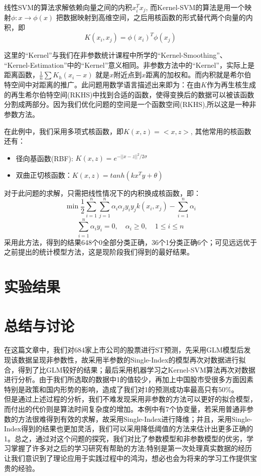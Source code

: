 \documentclass[a4paper,UTF8]{article}
\begin{document}
线性SVM的算法求解依赖向量之间的内积$x_{i}^{T}x_{j}$, 而Kernel-SVM的算法是用一个映射$\phi:x\rightarrow\phi(x)$ 把数据映射到高维空间，之后用核函数的形式替代两个向量的内积，即
$$K(x_{i},x_{j})=\phi(x_{i})^{T}\phi(x_{j}) $$

这里的“Kernel”与我们在非参数统计课程中所学的“Kernel-Smoothing”、\\“Kernel-Estimation”中的“Kernel”意义相同。非参数方法中的“Kernel”，实际上是距离函数，$\frac{1}{n}\sum K_{h}(x_{i}-x)$ 就是$x$附近点到$x$距离的加权和。而内积就是希尔伯特空间中对距离的推广。此问题用数学语言描述出来即为：在由$K$作为再生核生成的再生希尔伯特空间(RKHS)中找到合适的函数，使得变换后的数据可以被该函数分割成两部分。因为我们优化问题的空间是一个函数空间(RKHS),所以这是一种非参数方法。

在此例中，我们采用多项式核函数，即$K(x,z)=<x,z> $, 其他常用的核函数还有：
\begin{itemize}
	\item 径向基函数(RBF): $K(x,z)=e^{-||x-z||^{2}/2\sigma} $
	\item 双曲正切核函数：$K(x,z)=tanh(kx^{T}y+\theta) $
\end{itemize}

对于此问题的求解，只需把线性情况下的内积换成核函数，即：
$$\min \frac{1}{2}  \sum_{i=1}^{n}\sum_{j=1}^{n} \alpha_{i}\alpha_{j}y_{i}y_{j}k(x_{i},x_{j}) - \sum_{i=1}^{n}\alpha_{i}$$
$$\sum_{i=1}^{n}\alpha_{i}y_{i}=0,\quad \alpha_{i} \geq 0,\quad 1\leq i \leq n $$
采用此方法，得到的结果648个0全部分类正确，36个1分类正确6个；可见远远优于之前提出的统计模型方法，这是现阶段我们得到的最好结果。

\section{实验结果}

\section{总结与讨论}
在这篇文章中，我们对684家上市公司的股票进行ST预测，先采用GLM模型后发现该数据呈现非参数性，故采用半参数的Single-Index的模型再次对数据进行拟合，得到了比GLM较好的结果；最后采用机器学习之Kernel-SVM算法再次对数据进行分析。由于我们所选取的数据中1的值较少，再加上中国股市受很多方面因素特别是政策和国内形势的影响，造成了我们对1的预测成功率最高只有50\%。\\

但是通过上述过程的分析，我们不难发现采用非参数的方法可以更好的拟合模型，而付出的代价则是算法时间复杂度的增加。本例中有7个协变量，若采用普通非参数的方法很难得到有效的求解，故采用Single-Index进行降维；并且，采用Single-Index得到的结果也更加灵活，我们可以采用降低阈值的方法来估计出更多正确的1。总之，通过对这个问题的探究，我们对比了参数模型和非参数模型的优劣，学习掌握了许多对之后的学习研究有帮助的方法;特别是第一次处理真实数据的经历让我们意识到了理论应用于实践过程中的鸿沟，想必也会为将来的学习工作提供宝贵的经验。
\cite{kipf2016semi}


\nocite{*}   %


\end{document}
